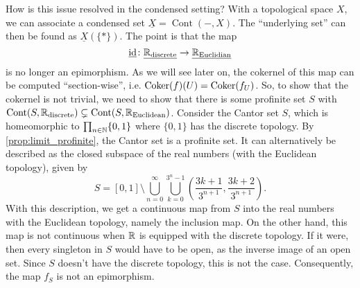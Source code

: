 \documentclass{article}
\DeclareMathOperator{\Cont}{Cont}
\DeclareMathOperator{\id}{id}
\begin{document}
How is this issue resolved in the condensed setting?
With a topological space $X$, we can associate a
condensed set $\underline{X} = \Cont(-, X)$. The
``underlying set'' can then be found as $\underline{X}(\{*\})$.
The point is that the map
\begin{equation*}
    \underline{\id}\colon \underline{\bbR_{\text{discrete}}} \to \underline{\bbR_{\text{Euclidian}}}
\end{equation*}
is no longer an epimorphism. As we will see later on, the cokernel
of this map can be computed ``section-wise'', i.e. $\operatorname{Coker}(f)(U) = \operatorname{Coker}(f_U)$.
So, to show that the cokernel is not trivial, we need to show that
there is some profinite set $S$ with
$\Cont(S, \bbR_{\text{discrete}}) \subsetneq \Cont(S,\bbR_{\text{Euclidean}})$.
Consider the Cantor set $S$, which is homeomorphic to $\prod_{n\in \mathbb{N}}\{0,1\}$
where $\{0,1\}$ has the discrete topology. By \cref{prop:limit_profinite}, the
Cantor set is a profinite set. It can alternatively be described as the
closed subspace of the real numbers (with the Euclidean topology), given by
\begin{equation*}
    S = [0,1]\setminus \bigcup_{n=0}^\infty \bigcup_{k=0}^{3^n-1}
    \left(\frac{3k+1}{3^{n+1}},\frac{3k+2}{3^{n+1}}\right).
\end{equation*}
With this description, we get a continuous map from $S$ into the real numbers
with the Euclidean topology, namely the inclusion map. On the other hand,
this map is not continuous when $\mathbb{R}$ is equipped with the discrete topology.
If it were, then every singleton in $S$ would have to be open, as the inverse
image of an open set. Since $S$ doesn't have the discrete topology, this is
not the case. Consequently, the map $f_S$ is not an epimorphism.
\end{document}
